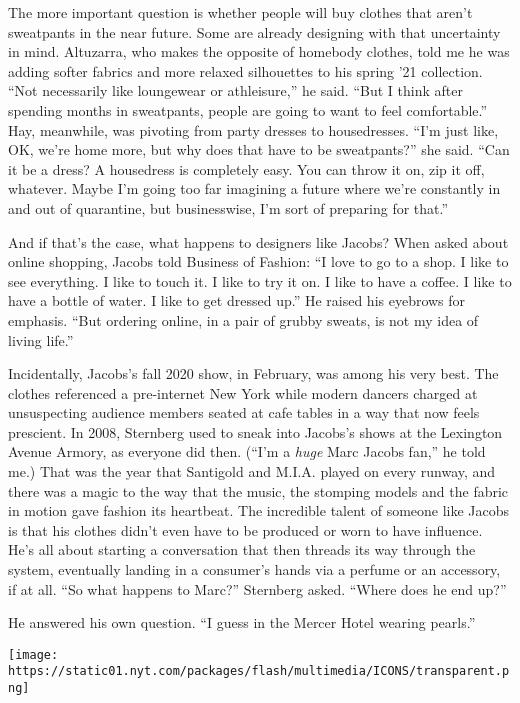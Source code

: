 The more important question is whether people will buy clothes that
aren't sweatpants in the near future. Some are already designing with
that uncertainty in mind. Altuzarra, who makes the opposite of homebody
clothes, told me he was adding softer fabrics and more relaxed
silhouettes to his spring '21 collection. ``Not necessarily like
loungewear or athleisure,'' he said. ``But I think after spending months
in sweatpants, people are going to want to feel comfortable.'' Hay,
meanwhile, was pivoting from party dresses to housedresses. ``I'm just
like, OK, we're home more, but why does that have to be sweatpants?''
she said. ``Can it be a dress? A housedress is completely easy. You can
throw it on, zip it off, whatever. Maybe I'm going too far imagining a
future where we're constantly in and out of quarantine, but
businesswise, I'm sort of preparing for that.''

And if that's the case, what happens to designers like Jacobs? When
asked about online shopping, Jacobs told Business of Fashion: ``I love
to go to a shop. I like to see everything. I like to touch it. I like to
try it on. I like to have a coffee. I like to have a bottle of water. I
like to get dressed up.'' He raised his eyebrows for emphasis. ``But
ordering online, in a pair of grubby sweats, is not my idea of living
life.''

Incidentally, Jacobs's fall 2020 show, in February, was among his very
best. The clothes referenced a pre-internet New York while modern
dancers charged at unsuspecting audience members seated at cafe tables
in a way that now feels prescient. In 2008, Sternberg used to sneak into
Jacobs's shows at the Lexington Avenue Armory, as everyone did then.
(``I'm a \emph{huge} Marc Jacobs fan,'' he told me.) That was the year
that Santigold and M.I.A. played on every runway, and there was a magic
to the way that the music, the stomping models and the fabric in motion
gave fashion its heartbeat. The incredible talent of someone like Jacobs
is that his clothes didn't even have to be produced or worn to have
influence. He's all about starting a conversation that then threads its
way through the system, eventually landing in a consumer's hands via a
perfume or an accessory, if at all. ``So what happens to Marc?''
Sternberg asked. ``Where does he end up?''

He answered his own question. ``I guess in the Mercer Hotel wearing
pearls.''

\texttt{[image: https://static01.nyt.com/packages/flash/multimedia/ICONS/transparent.png]}

